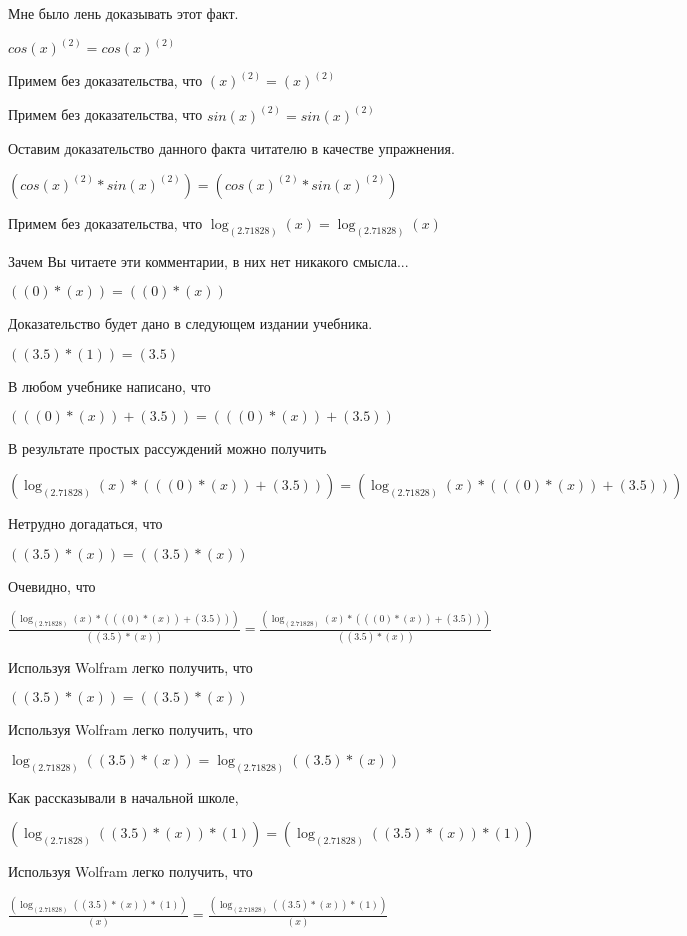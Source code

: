\documentclass[12pt,a4paper,fleqn]{article}
\theoremstyle{definition}
\begin{document}
Мне было лень доказывать этот факт.

$cos{( x )}^{( 2 )} = cos{( x )}^{( 2 )}$

Примем без доказательства, что
${( x )}^{( 2 )} = {( x )}^{( 2 )}$

Примем без доказательства, что
$sin{( x )}^{( 2 )} = sin{( x )}^{( 2 )}$

Оставим доказательство данного факта читателю в качестве упражнения.

$(cos{( x )}^{( 2 )} * sin{( x )}^{( 2 )}) = (cos{( x )}^{( 2 )} * sin{( x )}^{( 2 )})$

Примем без доказательства, что
$\log_{( 2.71828 )}{( x )} = \log_{( 2.71828 )}{( x )}$

Зачем Вы читаете эти комментарии, в них нет никакого смысла...

$(( 0 ) * ( x )) = (( 0 ) * ( x ))$

Доказательство будет дано в следующем издании учебника.

$(( 3.5 ) * ( 1 )) = ( 3.5 )$

В любом учебнике написано, что

$((( 0 ) * ( x )) + ( 3.5 )) = ((( 0 ) * ( x )) + ( 3.5 ))$

В результате простых рассуждений можно получить

$(\log_{( 2.71828 )}{( x )} * ((( 0 ) * ( x )) + ( 3.5 ))) = (\log_{( 2.71828 )}{( x )} * ((( 0 ) * ( x )) + ( 3.5 )))$

Нетрудно догадаться, что

$(( 3.5 ) * ( x )) = (( 3.5 ) * ( x ))$

Очевидно, что

$\frac{(\log_{( 2.71828 )}{( x )} * ((( 0 ) * ( x )) + ( 3.5 )))}{(( 3.5 ) * ( x ))}
 = \frac{(\log_{( 2.71828 )}{( x )} * ((( 0 ) * ( x )) + ( 3.5 )))}{(( 3.5 ) * ( x ))}
$

Используя Wolfram легко получить, что

$(( 3.5 ) * ( x )) = (( 3.5 ) * ( x ))$

Используя Wolfram легко получить, что

$\log_{( 2.71828 )}{(( 3.5 ) * ( x ))} = \log_{( 2.71828 )}{(( 3.5 ) * ( x ))}$

Как рассказывали в начальной школе,

$(\log_{( 2.71828 )}{(( 3.5 ) * ( x ))} * ( 1 )) = (\log_{( 2.71828 )}{(( 3.5 ) * ( x ))} * ( 1 ))$

Используя Wolfram легко получить, что

$\frac{(\log_{( 2.71828 )}{(( 3.5 ) * ( x ))} * ( 1 ))}{( x )}
 = \frac{(\log_{( 2.71828 )}{(( 3.5 ) * ( x ))} * ( 1 ))}{( x )}
$
\end{document}
